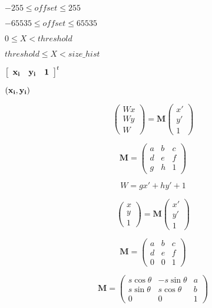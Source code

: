 \documentclass{article}
\begin{document}
{{{$ -255 \le offset \le 255 $
\pagebreak

$ -65535 \le offset \le 65535 $
\pagebreak

$ 0 \le X < threshold $
\pagebreak

$ threshold \le X < size\_hist $
\pagebreak

$ \left[ \begin{array}{ccc} \bf{x_i} & \bf{y_i} & \bf{1} \end{array} \right]^t $
\pagebreak

$ \left( \bf{x_i} , \bf{y_i} \right) $
\pagebreak

\[ \left( \begin{array}{c} Wx \\ Wy \\ W \end{array} \right) = \mathbf{M} \left( \begin{array}{c} x' \\ y' \\ 1 \end{array} \right) \]
\pagebreak

\[ \mathbf{M} = \left( \begin{array}{ccc} a & b & c \\ d & e & f \\ g & h & 1 \end{array} \right) \]
\pagebreak

\[W = gx'+hy'+1\]
\pagebreak

\[ \left( \begin{array}{c} x \\ y \\ 1 \end{array} \right) = \mathbf{M} \left( \begin{array}{c} x' \\ y' \\ 1 \end{array} \right) \]
\pagebreak

\[ \mathbf{M} = \left( \begin{array}{ccc} a & b & c \\ d & e & f \\ 0 & 0 & 1 \end{array} \right) \]
\pagebreak

\[ \mathbf{M} = \left( \begin{array}{ccc} s \cos \theta & - s \sin \theta & a \\ s \sin \theta & s \cos \theta & b \\ 0 & 0 & 1 \end{array} \right) \]
\pagebreak

}}}
\end{document}
